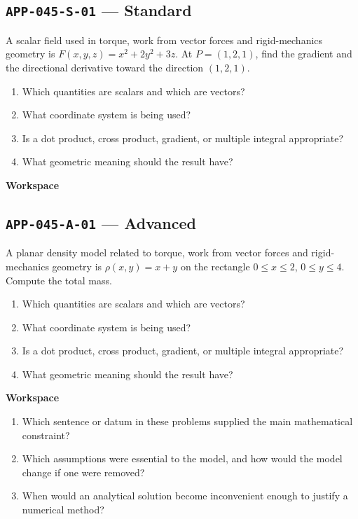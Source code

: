 \documentclass[11pt]{book}
\newcommand{\pid}[1]{\texttt{#1}}
\newcommand{\workspace}{\par\vspace{0.7in}\hrulefill\par\vspace{0.55in}\hrulefill\par}
\begin{document}
\subsection*{\pid{APP-045-S-01} — Standard}
\begin{problembox}
A scalar field used in torque, work from vector forces and rigid-mechanics geometry is $F(x,y,z)=x^2+2y^2+3z$. At $P=(1,2,1)$, find the gradient and the directional derivative toward the direction $(1,2,1)$.
\end{problembox}
\begin{promptbox}\begin{enumerate}
\item Which quantities are scalars and which are vectors?
\item What coordinate system is being used?
\item Is a dot product, cross product, gradient, or multiple integral appropriate?
\item What geometric meaning should the result have?
\end{enumerate}\end{promptbox}
\textbf{Workspace}\workspace
{}
\subsection*{\pid{APP-045-A-01} — Advanced}
\begin{problembox}
A planar density model related to torque, work from vector forces and rigid-mechanics geometry is $\rho(x,y)=x+y$ on the rectangle $0\le x\le 2$, $0\le y\le 4$. Compute the total mass.
\end{problembox}
\begin{promptbox}\begin{enumerate}
\item Which quantities are scalars and which are vectors?
\item What coordinate system is being used?
\item Is a dot product, cross product, gradient, or multiple integral appropriate?
\item What geometric meaning should the result have?
\end{enumerate}\end{promptbox}
\textbf{Workspace}\workspace
\begin{reflectionbox}\begin{enumerate}
\item Which sentence or datum in these problems supplied the main mathematical constraint?
\item Which assumptions were essential to the model, and how would the model change if one were removed?
\item When would an analytical solution become inconvenient enough to justify a numerical method?
\end{enumerate}\end{reflectionbox}
\end{document}
